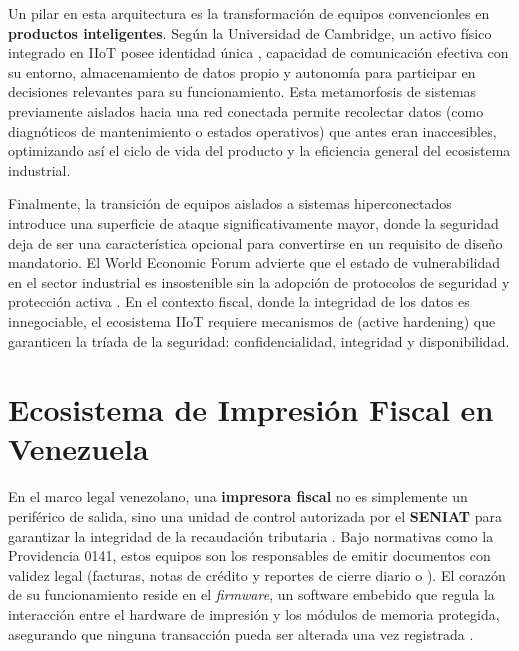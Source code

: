 \par Un pilar en esta arquitectura es la transformación de equipos convencionles en \textbf{productos inteligentes}. Según la Universidad de Cambridge, un activo físico integrado en IIoT posee identidad única \cite{Connected_Everything_2016}, capacidad de comunicación efectiva con su entorno, almacenamiento de datos propio y autonomía para participar en decisiones relevantes para su funcionamiento. Esta metamorfosis de sistemas previamente aislados hacia una red conectada permite recolectar datos  (como diagnóticos de mantenimiento o estados operativos) que antes eran inaccesibles, optimizando así el ciclo de vida del producto y la eficiencia general del ecosistema industrial.\\

\par Finalmente, la transición de equipos aislados a sistemas hiperconectados introduce una superficie de ataque significativamente mayor, donde la seguridad deja de ser una característica opcional para convertirse en un requisito de diseño mandatorio. El World Economic Forum advierte que el estado de vulnerabilidad en el sector industrial es insostenible sin la adopción de protocolos de seguridad y protección activa \cite{WEF_IIoT_2018}. En el contexto fiscal, donde la integridad de los datos es innegociable, el ecosistema IIoT requiere mecanismos de  (active hardening) que garanticen la tríada de la seguridad: confidencialidad, integridad y disponibilidad.\\

\section{Ecosistema de Impresión Fiscal en Venezuela}

\par En el marco legal venezolano, una \textbf{impresora fiscal} no es simplemente un periférico de salida, sino una unidad de control autorizada por el \textbf{SENIAT} para garantizar la integridad de la recaudación tributaria \cite{TheFactoryHKA_Manual_Protocolos}. Bajo normativas como la Providencia 0141, estos equipos son los responsables de emitir documentos con validez legal (facturas, notas de crédito y reportes de cierre diario o ). El corazón de su funcionamiento reside en el \textit{firmware}, un software embebido que regula la interacción entre el hardware de impresión y los módulos de memoria protegida, asegurando que ninguna transacción pueda ser alterada una vez registrada \cite{TheFactoryHKA_Manual_Protocolos, TheFactoryHKA_iSmart_Manual}.

